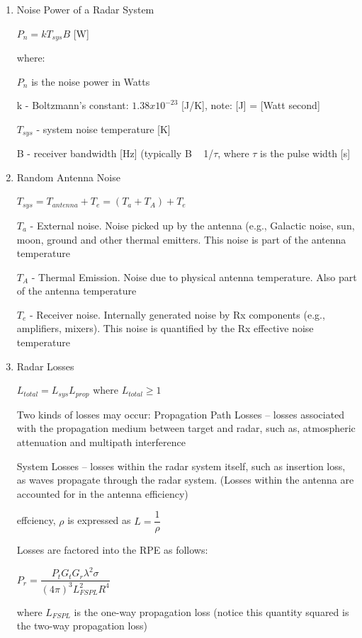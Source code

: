 \documentclass[10pt]{article}
\renewcommand{\frac}{\dfrac}
\begin{document}
\begin{enumerate}

	\item Noise Power of a Radar System
	
	\centerline{$P_n = kT_{sys}B$ [W]}
	
	where:
	
	$P_n$ is the noise power in Watts
	
	k - Boltzmann’s constant: $1.38x10^{-23}$ [J/K], note: [J] = [Watt second]
	
	$T_{sys}$ -  system noise temperature [K]
	
	B - receiver bandwidth [Hz] (typically B ~ 1/$\tau$, where $\tau$ is the pulse width [s]

	\item Random Antenna Noise
	
	\centerline{$T_{sys} = T_{antenna} + T_e = (T_a +T_A) + T_e$}
	
	$T_a$ - External noise. Noise picked up by the antenna (e.g., Galactic
noise, sun, moon, ground and other thermal emitters. This noise is
part of the antenna temperature
	
	$T_A$ - Thermal Emission. Noise due to physical antenna temperature.
Also part of the antenna temperature
	
	$T_e$ - Receiver noise. Internally generated noise by Rx components (e.g.,
amplifiers, mixers). This noise is quantified by the Rx effective
noise temperature


	\item Radar Losses
	
	\centerline{$L_{total} = L_{sys}L_{prop}$ where $L_{total}\ge1$}
	
	Two kinds of losses may occur:
	Propagation Path Losses – losses associated with the propagation
	medium between target and radar, such as, atmospheric attenuation and
	multipath interference

	System Losses – losses within the radar system itself, such as insertion
	loss, as waves propagate through the radar system. (Losses within the
	antenna are accounted for in the antenna efficiency)
	
	effciency, $\rho$ is expressed as $L = \frac{1}{\rho}$
	
	Losses are factored into the RPE as follows:
	
	\centerline{$P_r = \frac{P_t G_t G_r {\lambda}^2 \sigma}{(4\pi)^3 L_{FSPL}^2R^4}$}
	
	where $L_{FSPL}$ is the one-way propagation loss (notice this quantity squared is the two-way propagation loss)



\end{enumerate}
\end{document}
